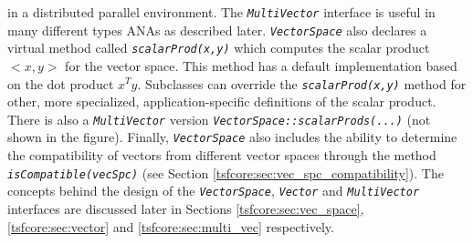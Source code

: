 in a distributed parallel environment.  The
\texttt{\textit{Multi\-Vector}} interface is useful in many different
types ANAs as described later. \texttt{\textit{VectorSpace}} also
declares a virtual method called
\texttt{\textit{scalarProd(x,y)}} which computes the scalar product
$<x,y>$ for the vector space. This method has a default implementation
based on the dot product $x^T y$.  Subclasses can override the
\texttt{\textit{scalarProd(x,y)}} method for other, more specialized,
application-specific definitions of the scalar product. There is also
a \texttt{\textit{Multi\-Vector}} version
\texttt{\textit{VectorSpace\-::scalarProds(...)}} (not shown in the
figure).  Finally, \texttt{\textit{VectorSpace}} also includes the
ability to determine the compatibility of vectors from different
vector spaces through the method
\texttt{\textit{isCompatible(vecSpc)}} (see Section
\ref{tsfcore:sec:vec_spc_compatibility}).  The concepts behind the design
of the \texttt{\textit{VectorSpace}},
\texttt{\textit{Vector}} and
\texttt{\textit{Multi\-Vector}} interfaces are discussed later in Sections
\ref{tsfcore:sec:vec_space}, \ref{tsfcore:sec:vector} and \ref{tsfcore:sec:multi_vec}
respectively.

